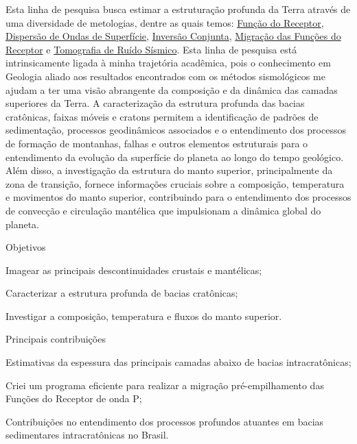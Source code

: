\documentclass[10pt,a4paper,oneside]{book}
\begin{document}
Esta linha de pesquisa busca estimar a estruturação profunda da Terra através de uma diversidade de metologias, dentre as quais temos: \href{https://doi.org/10.1029/JB084iB09p04749}{Função do Receptor}, \href{https://doi.org/10.1111/j.1365-246X.1990.tb04573.x}{Dispersão de Ondas de Superfície}, \href{https://doi.org/10.1046/j.1365-246x.2000.00217.x}{Inversão Conjunta}, \href{https://doi.org/10.1016/j.epsl.2013.08.025}{Migração das Funções do Receptor} e \href{https://doi.org/10.1111/j.1365-246X.2007.03374.x}{Tomografia de Ruído Sísmico}. Esta linha de pesquisa está intrinsicamente ligada à minha trajetória acadêmica, pois o conhecimento em Geologia aliado aos resultados encontrados com os métodos sismológicos me ajudam a ter uma visão abrangente da composição e da dinâmica das camadas superiores da Terra. A caracterização da estrutura profunda das bacias cratônicas, faixas móveis e cratons permitem a identificação de padrões de sedimentação, processos geodinâmicos associados e o entendimento dos processos de formação de montanhas, falhas e outros elementos estruturais para o entendimento da evolução da superfície do planeta ao longo do tempo geológico. Além disso, a investigação da estrutura do manto superior, principalmente da zona de transição, fornece informações cruciais sobre a composição, temperatura e movimentos do manto superior, contribuindo para o entendimento dos processos de convecção e circulação mantélica que impulsionam a dinâmica global do planeta.  

\begin{fancyenum}{\faBullseye}{Objetivos}
	\item Imagear as principais descontinuidades crustais e mantélicas;
	\item Caracterizar a estrutura profunda de bacias cratônicas;
	\item Investigar a composição, temperatura e fluxos do manto superior.
\end{fancyenum}

\begin{fancyenum}{\faLightbulb}{Principais contribuições}
	\item Estimativas da espessura das principais camadas abaixo de bacias intracratônicas;
	\item Criei um programa eficiente para realizar a migração pré-empilhamento das Funções do Receptor de onda P;
	\item Contribuições no entendimento dos processos profundos atuantes em bacias sedimentares intracratônicas no Brasil.
\end{fancyenum}
\end{document}
